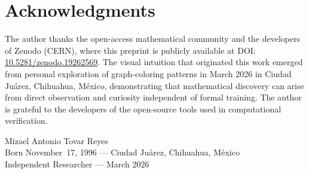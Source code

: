 \documentclass[12pt,a4paper]{article}
\theoremstyle{definition}
\begin{document}
\section*{Acknowledgments}

The author thanks the open-access mathematical community and the
developers of Zenodo (CERN), where this preprint is publicly available
at DOI: \href{https://doi.org/10.5281/zenodo.19262569}{10.5281/zenodo.19262569}.
The visual intuition that originated this work emerged from personal
exploration of graph-coloring patterns in March 2026 in Ciudad
Ju\'arez, Chihuahua, M\'exico, demonstrating that mathematical
discovery can arise from direct observation and curiosity independent
of formal training. The author is grateful to the developers of the
open-source tools used in computational verification.

\bigskip
\noindent Mizael Antonio Tovar Reyes\\
Born November~17, 1996 --- Ciudad Ju\'arez, Chihuahua, M\'exico\\
Independent Researcher --- March 2026
\end{document}
